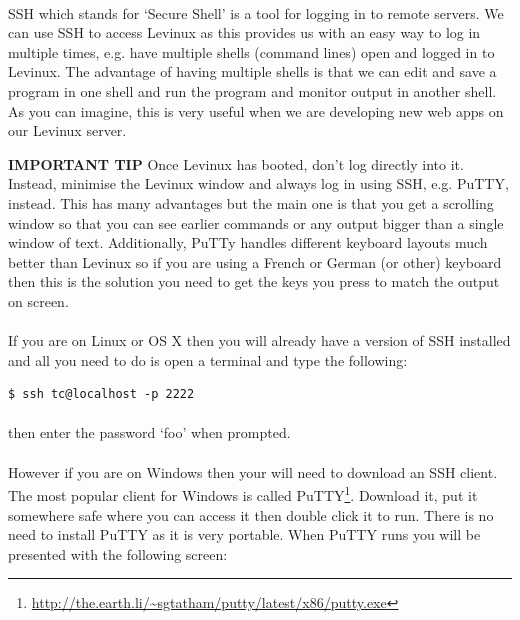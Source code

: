 \documentclass[12pt, a4paper, twoside]{book}
\begin{document}
\paragraph{} SSH which stands for `Secure Shell' is a tool for logging in to remote servers. We can use SSH to access Levinux as this provides us with an easy way to log in multiple times, e.g. have multiple shells (command lines) open and logged in to Levinux. The advantage of having multiple shells is that we can edit and save a program in one shell and run the program and monitor output in another shell. As you can imagine, this is very useful when we are developing new web apps on our Levinux server.

\begin{framed}
\textbf{IMPORTANT TIP} Once Levinux has booted, don't log directly into it. Instead, minimise the Levinux window and always log in using SSH, e.g. PuTTY, instead. This has many advantages but the main one is that you get a scrolling window so that you can see earlier commands or any output bigger than a single window of text. Additionally, PuTTy handles different keyboard layouts much better than Levinux so if you are using a French or German (or other) keyboard then this is the solution you need to get the keys you press to match the output on screen.
\end{framed}

\paragraph{} If you are on Linux or OS X then you will already have a version of SSH installed and all you need to do is open a terminal and type the following:

\begin{lstlisting}[style=DOS]
    $ ssh tc@localhost -p 2222
\end{lstlisting}

\paragraph{} then enter the password `foo' when prompted.

\paragraph{} However if you are on Windows then your will need to download an SSH client. The most popular client for Windows is called PuTTY\footnote{\url{http://the.earth.li/~sgtatham/putty/latest/x86/putty.exe}}. Download it, put it somewhere safe where you can access it then double click it to run. There is no need to install PuTTY as it is very portable. When PuTTY runs you will be presented with the following screen:
\end{document}
